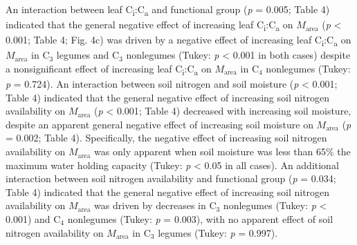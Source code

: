 An interaction between leaf C\textsubscript{i}:C\textsubscript{a} and functional group (\textit{p} = 0.005; Table 4) indicated that the general negative effect of increasing leaf C\textsubscript{i}:C\textsubscript{a} on $M_\mathrm{area}$ (\textit{p} < 0.001; Table 4; Fig. 4c) was driven by a negative effect of increasing leaf C\textsubscript{i}:C\textsubscript{a} on $M_\mathrm{area}$ in C$_3$ legumes and C$_3$ nonlegumes (Tukey: \textit{p} < 0.001 in both cases) despite a nonsignificant effect of increasing leaf C\textsubscript{i}:C\textsubscript{a} on $M_\mathrm{area}$ in C$_4$ nonlegumes (Tukey: \textit{p} = 0.724). An interaction between soil nitrogen and soil moisture (\textit{p} < 0.001; Table 4) indicated that the general negative effect of increasing soil nitrogen availability on $M_\mathrm{area}$ (\textit{p} < 0.001; Table 4) decreased with increasing soil moisture, despite an apparent general negative effect of increasing soil moisture on $M_\mathrm{area}$ (\textit{p} = 0.002; Table 4). Specifically, the negative effect of increasing soil nitrogen availability on $M_\mathrm{area}$ was only apparent when soil moisture was less than 65\% the maximum water holding capacity (Tukey: \textit{p} < 0.05 in all cases). An additional interaction between soil nitrogen availability and functional group (\textit{p} = 0.034; Table 4) indicated that the general negative effect of increasing soil nitrogen availability on $M_\mathrm{area}$ was driven by decreases in C$_3$ nonlegumes (Tukey: \textit{p} < 0.001) and C$_4$ nonlegumes (Tukey: \textit{p} = 0.003), with no apparent effect of soil nitrogen availability on $M_\mathrm{area}$ in C$_3$ legumes (Tukey: \textit{p} = 0.997).

